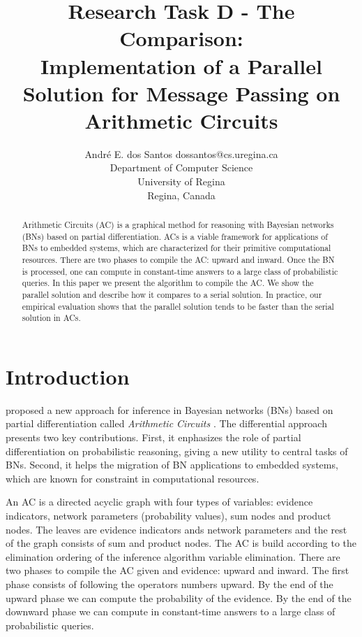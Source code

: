 \documentclass[twoside,11pt]{article}
\begin{document}
\title{Research Task D - The Comparison: \\ Implementation of a Parallel Solution for Message Passing on Arithmetic Circuits}

\author{\name Andr\'e E. dos Santos \email dossantos@cs.uregina.ca \\
\addr Department of Computer Science \\
University of Regina \\ 
Regina, Canada
}



\maketitle

\begin{abstract}%
Arithmetic Circuits (AC) is a graphical method for reasoning with Bayesian networks (BNs) based on partial differentiation.
ACs is a viable framework for applications of BNs to embedded systems, which are characterized for their primitive computational resources. 
There are two phases to compile the AC: upward and inward.
Once the BN is processed, one can compute in constant-time answers to a large class of probabilistic queries.
In this paper we present the algorithm to compile the AC.
We show the parallel solution and describe how it compares to a serial solution.
In practice, our empirical evaluation shows that the parallel solution tends to be faster than the serial solution in ACs.
\end{abstract}


\section{Introduction}
\label{sec:intro}

\cite{darwiche00} proposed a new approach for inference in Bayesian networks (BNs) \citep{pear88}  based on partial differentiation called \emph{Arithmetic Circuits} \citep{darwiche00}.
The differential approach presents two key contributions.
First, it enphasizes the role of partial differentiation on probabilistic reasoning, giving a new utility to central tasks of BNs.
Second, it helps the migration of BN applications to embedded systems, which are known for constraint in computational resources.

An AC is a directed acyclic graph with four types of variables: evidence indicators, network parameters (probability values), sum nodes and product nodes.
The leaves are evidence indicators ands network parameters and the rest of the graph consists of sum and product nodes.
The AC is build according to the elimination ordering of the inference algorithm variable elimination. 
There are two phases to compile the AC given and evidence: upward and inward.
The first phase consists of following the operators numbers upward.
By the end of the upward phase we can compute the probability of the evidence.
By the end of the downward phase we can compute in constant-time answers to a large class of probabilistic queries.
\end{document}
